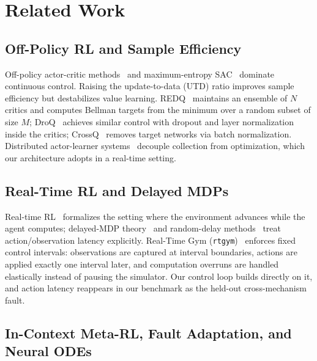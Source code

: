 \documentclass[conference]{IEEEtran}
\begin{document}
\section{Related Work}

\label{sec:related_work}



\subsection{Off-Policy RL and Sample Efficiency}

Off-policy actor-critic methods~\cite{ddpg,td3} and maximum-entropy SAC~\cite{sac} dominate continuous control. Raising the update-to-data (UTD) ratio improves sample efficiency but destabilizes value learning. REDQ~\cite{redq} maintains an ensemble of $N$ critics and computes Bellman targets from the minimum over a random subset of size $M$; DroQ~\cite{droq} achieves similar control with dropout and layer normalization inside the critics; CrossQ~\cite{crossq} removes target networks via batch normalization. Distributed actor-learner systems~\cite{apex} decouple collection from optimization, which our architecture adopts in a real-time setting.



\subsection{Real-Time RL and Delayed MDPs}

Real-time RL~\cite{rtrl} formalizes the setting where the environment advances while the agent computes; delayed-MDP theory~\cite{delayedmdp} and random-delay methods~\cite{bouteiller2021delays} treat action/observation latency explicitly. Real-Time Gym (\texttt{rtgym})~\cite{rtgym} enforces fixed control intervals: observations are captured at interval boundaries, actions are applied exactly one interval later, and computation overruns are handled elastically instead of pausing the simulator. Our control loop builds directly on it, and action latency reappears in our benchmark as the held-out cross-mechanism fault.



\subsection{In-Context Meta-RL, Fault Adaptation, and Neural ODEs}
\end{document}
